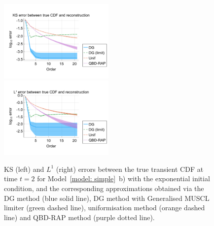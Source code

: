 \begin{figure}
	\centering
	\includegraphics[width=0.5\textwidth,trim={0.75cm 0.8cm 0.25cm 1.25cm},clip]{chapter6/figs/hitting_times_model/reflecting_model/transient_distribution/exp/ks_error_formatted.pdf}%
	\includegraphics[width=0.5\textwidth,trim={0.75cm 0.8cm 0.25cm 1.25cm},clip]{chapter6/figs/hitting_times_model/reflecting_model/transient_distribution/exp/l1_cdf_error_formatted.pdf}
	\caption{KS (left) and \(L^1\) (right) errors between the true transient CDF at time \(t=2\) for Model~\ref{model: simple}~b) with the exponential initial condition, and the corresponding approximations obtained via the DG method (blue solid line), DG method with Generalised MUSCL limiter (green dashed line), uniformisation method (orange dashed line) and QBD-RAP method (purple dotted line).} 
	\label{fig: reflecting transient exp} 
\end{figure}

